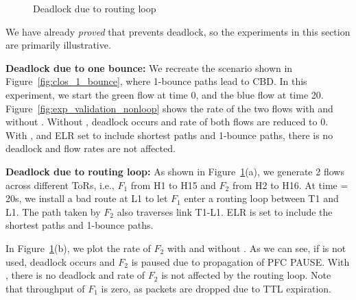 \begin{figure}[t]
	\centering
	
	
	\caption{Deadlock due to routing loop}\label{fig:exp_validation_loop}
	
\end{figure}

We have already {\em proved} that \sysname{} prevents deadlock, so the
experiments in this section are primarily illustrative.

\textbf{Deadlock due to one bounce:} We recreate the scenario shown in
Figure~\ref{fig:clos_1_bounce}, where 1-bounce paths lead to CBD.  In this
experiment, we start the green flow at time 0, and the blue flow at time 20.
Figure~\ref{fig:exp_validation_nonloop} shows the rate of the two flows with and
without \sysname{}.  Without \sysname{}, deadlock occurs and rate of both flows
are reduced to 0. With \sysname{}, and ELR set to include shortest paths and
1-bounce paths, there is no deadlock and flow rates are not affected.

\textbf{Deadlock due to routing loop:} As shown in
Figure~\ref{fig:exp_validation_loop}(a), we generate 2 flows across different
ToRs, i.e.,  $F_1$ from H1 to H15 and $F_2$ from H2 to H16. At time = 20s, we
install a bad route at L1 to let $F_1$ enter a routing loop between T1 and L1.
The path taken by $F_2$ also traverses link T1-L1.  ELR is set to include the
shortest paths and 1-bounce paths.

In Figure~\ref{fig:exp_validation_loop}(b), we plot the rate of $F_2$ with and
without \sysname{}. As we can see, if \sysname{} is not used, deadlock occurs
and $F_2$ is paused due to propagation of PFC PAUSE. With \sysname{}, there is
no deadlock and rate of $F_2$ is not affected by the routing loop. Note that
throughput of $F_1$ is zero, as packets are dropped due to TTL expiration.

